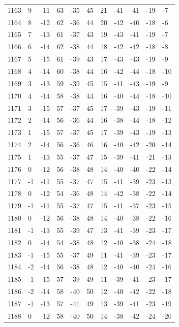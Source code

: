\begin{table}[H]
\begin{tabular}{lllllllllll}
1163 & 9 & -11 & 63 & -35 & 45 & 21 & -41 & -41 & -19 & -7 \\
1164 & 8 & -12 & 62 & -36 & 44 & 20 & -42 & -40 & -18 & -6 \\
1165 & 7 & -13 & 61 & -37 & 43 & 19 & -43 & -41 & -19 & -7 \\
1166 & 6 & -14 & 62 & -38 & 44 & 18 & -42 & -42 & -18 & -8 \\
1167 & 5 & -15 & 61 & -39 & 43 & 17 & -43 & -43 & -19 & -9 \\
1168 & 4 & -14 & 60 & -38 & 44 & 16 & -42 & -44 & -18 & -10 \\
1169 & 3 & -13 & 59 & -39 & 45 & 15 & -41 & -43 & -19 & -9 \\
1170 & 4 & -14 & 58 & -38 & 44 & 16 & -40 & -44 & -18 & -10 \\
1171 & 3 & -15 & 57 & -37 & 45 & 17 & -39 & -43 & -19 & -11 \\
1172 & 2 & -14 & 56 & -36 & 44 & 16 & -38 & -44 & -18 & -12 \\
1173 & 1 & -15 & 57 & -37 & 45 & 17 & -39 & -43 & -19 & -13 \\
1174 & 2 & -14 & 56 & -36 & 46 & 16 & -40 & -42 & -20 & -14 \\
1175 & 1 & -13 & 55 & -37 & 47 & 15 & -39 & -41 & -21 & -13 \\
1176 & 0 & -12 & 56 & -38 & 48 & 14 & -40 & -40 & -22 & -14 \\
1177 & -1 & -11 & 55 & -37 & 47 & 15 & -41 & -39 & -23 & -13 \\
1178 & 0 & -12 & 54 & -36 & 48 & 14 & -42 & -38 & -22 & -14 \\
1179 & -1 & -11 & 55 & -37 & 47 & 15 & -41 & -37 & -23 & -15 \\
1180 & 0 & -12 & 56 & -38 & 48 & 14 & -40 & -38 & -22 & -16 \\
1181 & -1 & -13 & 55 & -39 & 47 & 13 & -41 & -39 & -23 & -17 \\
1182 & 0 & -14 & 54 & -38 & 48 & 12 & -40 & -38 & -24 & -18 \\
1183 & -1 & -15 & 55 & -37 & 49 & 11 & -41 & -39 & -23 & -17 \\
1184 & -2 & -14 & 56 & -38 & 48 & 12 & -40 & -40 & -24 & -16 \\
1185 & -1 & -15 & 57 & -39 & 49 & 11 & -39 & -41 & -23 & -17 \\
1186 & -2 & -14 & 58 & -40 & 50 & 12 & -40 & -42 & -22 & -18 \\
1187 & -1 & -13 & 57 & -41 & 49 & 13 & -39 & -41 & -23 & -19 \\
1188 & 0 & -12 & 58 & -40 & 50 & 14 & -38 & -42 & -24 & -20 \\

\end{tabular}
\end{table}
